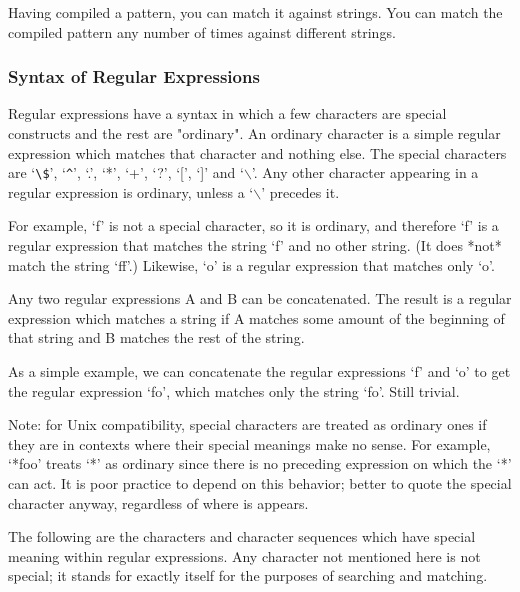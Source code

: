 Having compiled a pattern, you can match it against strings. You can
match the compiled pattern any number of times against different
strings.

\subsubsection{Syntax of Regular Expressions}

Regular expressions have a syntax in which a few characters are
special constructs and the rest are "ordinary". An ordinary
character is a simple regular expression which matches that character
and nothing else. The special characters are `\verb+\$+', `\verb+^+', `.', `*',
`+', `?', `[', `]' and `$\backslash$'. Any other character appearing in a
regular expression is ordinary, unless a `$\backslash$' precedes it.

For example, `f' is not a special character, so it is ordinary, and
therefore `f' is a regular expression that matches the string `f' and
no other string. (It does *not* match the string `ff'.) Likewise,
`o' is a regular expression that matches only `o'.

Any two regular expressions A and B can be concatenated. The result
is a regular expression which matches a string if A matches some
amount of the beginning of that string and B matches the rest of the
string.

As a simple example, we can concatenate the regular expressions `f'
and `o' to get the regular expression `fo', which matches only the
string `fo'. Still trivial.

Note: for Unix compatibility, special characters are treated as
ordinary ones if they are in contexts where their special meanings
make no sense. For example, `*foo' treats `*' as ordinary since
there is no preceding expression on which the `*' can act. It is
poor practice to depend on this behavior; better to quote the special
character anyway, regardless of where is appears.

The following are the characters and character sequences which have
special meaning within regular expressions. Any character not
mentioned here is not special; it stands for exactly itself for the
purposes of searching and matching.


